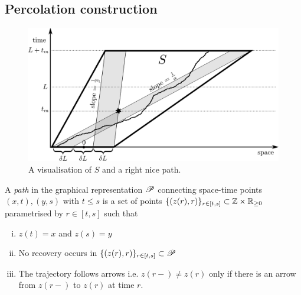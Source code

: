\subsection{Percolation construction}

\begin{figure}[!h]
  \includegraphics[width=\linewidth]{images/construction_single_tile}
  \caption{A visualisation of $S$ and a right nice path. }
  \label{fig:construction_single_tile}
\end{figure}

\begin{definition}
A \textit{path} in the graphical representation $\mathscr{P}$ connecting space-time points $(x, t), (y, s)$ with $t \leq s$ is a set of points $\{(z(r), r)\}_{r \in [t,s]} \subset \mathbb{Z} \times \mathbb{R}_{\geq 0}$ parametrised by $r \in [t, s]$ such that 
\begin{enumerate}[(i)] 
\item $z(t) = x$ and $z(s) = y$
\item No recovery occurs in $\{(z(r), r)\}_{r \in [t,s]} \subset \mathscr{P}$
\item The trajectory follows arrows i.e. $z(r-) \neq z(r)$ only if there is an arrow from $z(r-)$ to $z(r)$ at time $r$.   
\end{enumerate}
\end{definition}

